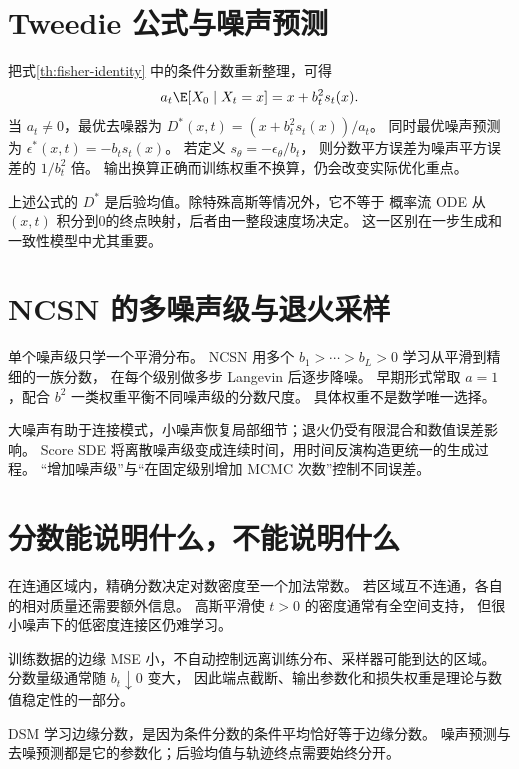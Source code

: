 \section{Tweedie 公式与噪声预测}

把式\eqref{th:fisher-identity} 中的条件分数重新整理，可得
\begin{equation}\label{th:tweedie}
a_t\E[X_0\mid X_t=x]=x+b_t^2s_t(x).
\end{equation}
当 $a_t\ne0$，最优去噪器为
$D^*(x,t)=(x+b_t^2s_t(x))/a_t$。
同时最优噪声预测为 $\epsilon^*(x,t)=-b_ts_t(x)$。
若定义 $s_\theta=-\epsilon_\theta/b_t$，
则分数平方误差为噪声平方误差的 $1/b_t^2$ 倍。
输出换算正确而训练权重不换算，仍会改变实际优化重点。

上述公式的 $D^*$ 是后验均值。除特殊高斯等情况外，它不等于
概率流 ODE 从 $(x,t)$ 积分到0的终点映射，后者由一整段速度场决定。
这一区别在一步生成和一致性模型中尤其重要。

\section{NCSN 的多噪声级与退火采样}

单个噪声级只学一个平滑分布。
NCSN 用多个 $b_1>\cdots>b_L>0$ 学习从平滑到精细的一族分数，
在每个级别做多步 Langevin 后逐步降噪。
早期形式常取 $a=1$，配合 $b^2$ 一类权重平衡不同噪声级的分数尺度。
具体权重不是数学唯一选择。

大噪声有助于连接模式，小噪声恢复局部细节；退火仍受有限混合和数值误差影响。
Score SDE 将离散噪声级变成连续时间，用时间反演构造更统一的生成过程。
“增加噪声级”与“在固定级别增加 MCMC 次数”控制不同误差。

\section{分数能说明什么，不能说明什么}

在连通区域内，精确分数决定对数密度至一个加法常数。
若区域互不连通，各自的相对质量还需要额外信息。
高斯平滑使 $t>0$ 的密度通常有全空间支持，
但很小噪声下的低密度连接区仍难学习。

训练数据的边缘 MSE 小，不自动控制远离训练分布、采样器可能到达的区域。
分数量级通常随 $b_t\downarrow0$ 变大，
因此端点截断、输出参数化和损失权重是理论与数值稳定性的一部分。

\begin{theorytakeaway}
DSM 学习边缘分数，是因为条件分数的条件平均恰好等于边缘分数。
噪声预测与去噪预测都是它的参数化；后验均值与轨迹终点需要始终分开。
\end{theorytakeaway}
